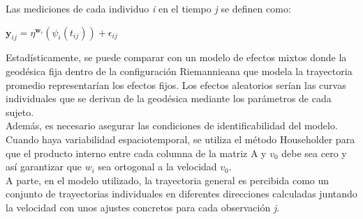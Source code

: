 	Las mediciones de cada individuo \textit{i} en el tiempo \textit{j} se definen como:
	\begin{center}
		$\textbf{y}_{ij}=\eta^{\textbf{w}_{i}}(\psi_{i}(t_{ij}))+\epsilon_{ij}$
	\end{center}
	
	Estadísticamente, se puede comparar con un modelo de efectos mixtos donde la geodésica fija dentro de la configuración Riemannieana que modela la trayectoria promedio representarían los efectos fijos. Los efectos aleatorios serían las curvas individuales que se derivan de la geodésica mediante los parámetros de cada sujeto.\\
	
	Además, es necesario asegurar las condiciones de identificabilidad del modelo. Cuando haya variabilidad espaciotemporal, se utiliza el método Householder para que el producto interno entre cada columna de la matriz A y $v_{0}$ debe sea cero y así garantizar que $\textit{w}_{i}$ sea ortogonal a la velocidad $v_{0}$.\\
	
	A parte, en el modelo utilizado, la trayectoria general es percibida como un conjunto de trayectorias individuales en diferentes direcciones calculadas juntando la velocidad con unos ajustes concretos para cada observación \textit{j}.\\
	
